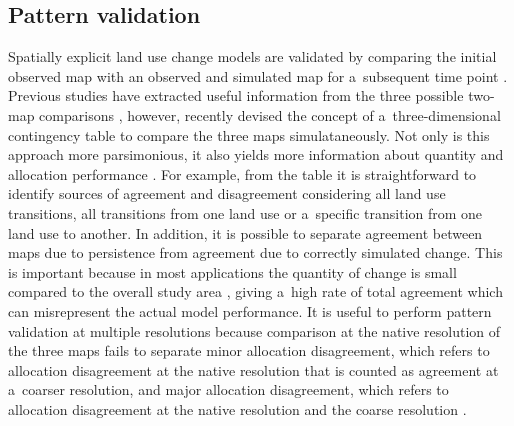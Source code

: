 \documentclass[gmdd, online, hvmath]{copernicus}
\begin{document}
\subsection{Pattern validation}

Spatially explicit land use change models are validated by comparing the initial observed map with an observed and simulated map for a~subsequent time point \citep{pontius2011}. Previous studies have extracted useful information from the three possible two-map comparisons \citep[e.g.][]{pontius2008}, however, recently \citet{pontius2011} devised the concept of a~three-dimensional contingency table to compare the three maps simulataneously. Not only is this approach more parsimonious, it also yields more information about quantity and allocation performance \citep{pontius2011}. For example, from the table it is straightforward to identify sources of agreement and disagreement considering all land use transitions, all transitions from one land use or a~specific transition from one land use to another. In addition, it is possible to separate agreement between maps due to persistence from agreement due to correctly simulated change. This is important because in most applications the quantity of change is small compared to the overall study area \citep{pontius2004,vanvliet2011}, giving a~high rate of total agreement which can misrepresent the actual model performance. It is useful to perform pattern validation at multiple resolutions because comparison at the native resolution of the three maps fails to separate minor allocation disagreement, which refers to allocation disagreement at the native resolution that is counted as agreement at a~coarser resolution, and major allocation disagreement, which refers to allocation disagreement at the native resolution and the coarse resolution \citep{pontius2011}. \\
\end{document}
